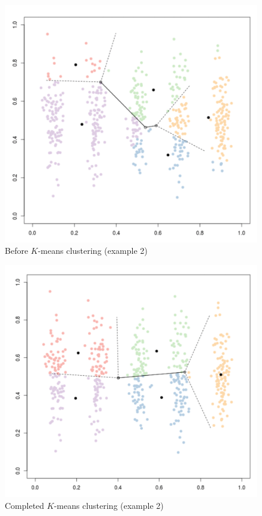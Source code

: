 \documentclass[a4paper]{article}
\begin{document}
\begin{figure}
\centering
\includegraphics[width=1.0\textwidth]{visualize0.png}
\caption{
\label{fig:kmeans_gif3}Before $K$-means clustering (example 2)}
\end{figure}

\begin{figure}
\centering
\includegraphics[width=1.0\textwidth]{visualize1.png}
\caption{\label{fig:kmeans_gif4}Completed $K$-means clustering (example 2)}
\end{figure}
\end{document}
